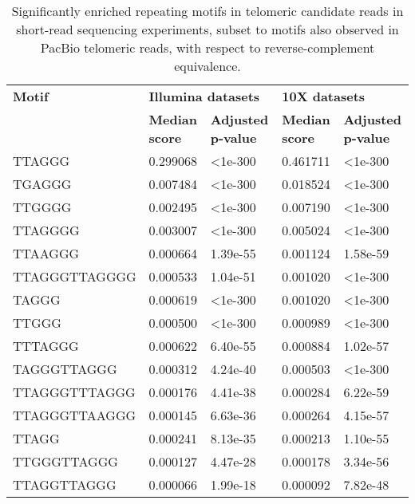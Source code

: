 \begin{samepage} \begin{table}[h!] \small \begin{tabular}{lllll}
\hline
\textbf{Motif}  & \multicolumn{2}{l}{\textbf{Illumina datasets}}    & \multicolumn{2}{l}{\textbf{10X datasets}}         \\
\textbf{}       & \textbf{Median score} & \textbf{Adjusted p-value} & \textbf{Median score} & \textbf{Adjusted p-value} \\
\hline
TTAGGG          & 0.299068              & <1e-300                   & 0.461711              & <1e-300                   \\
TGAGGG          & 0.007484              & <1e-300                   & 0.018524              & <1e-300                   \\
TTGGGG          & 0.002495              & <1e-300                   & 0.007190              & <1e-300                   \\
TTAGGGG         & 0.003007              & <1e-300                   & 0.005024              & <1e-300                   \\
TTAAGGG         & 0.000664              & 1.39e-55                  & 0.001124              & 1.58e-59                  \\
TTAGGGTTAGGGG   & 0.000533              & 1.04e-51                  & 0.001020              & <1e-300                   \\
TAGGG           & 0.000619              & <1e-300                   & 0.001020              & <1e-300                   \\
TTGGG           & 0.000500              & <1e-300                   & 0.000989              & <1e-300                   \\
TTTAGGG         & 0.000622              & 6.40e-55                  & 0.000884              & 1.02e-57                  \\
TAGGGTTAGGG     & 0.000312              & 4.24e-40                  & 0.000503              & <1e-300                   \\
TTAGGGTTTAGGG   & 0.000176              & 4.41e-38                  & 0.000284              & 6.22e-59                  \\
TTAGGGTTAAGGG   & 0.000145              & 6.63e-36                  & 0.000264              & 4.15e-57                  \\
TTAGG           & 0.000241              & 8.13e-35                  & 0.000213              & 1.10e-55                  \\
TTGGGTTAGGG     & 0.000127              & 4.47e-28                  & 0.000178              & 3.34e-56                  \\
TTAGGTTAGGG     & 0.000066              & 1.99e-18                  & 0.000092              & 7.82e-48                  \\
\hline
\end{tabular}
\caption{Significantly enriched repeating motifs in telomeric candidate reads in short-read sequencing experiments, subset to motifs also observed in PacBio telomeric reads, with respect to reverse-complement equivalence.}
\label{tab:shortread_repeatfinder}
\end{table}
\end{samepage}

